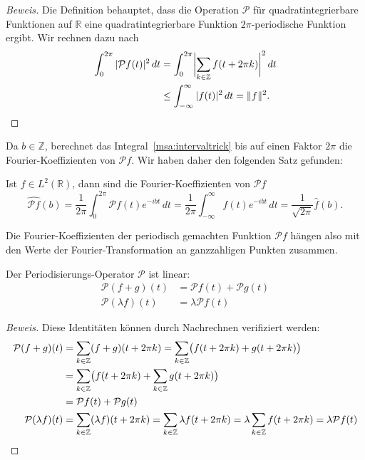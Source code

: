 \begin{proof}[Beweis]
Die Definition behauptet, dass die Operation $\mathcal{P}$ für
quadratintegrierbare Funktionen auf $\mathbb R$ eine quadratintegrierbare
Funktion $2\pi$-periodische Funktion ergibt.
Wir rechnen dazu nach
\begin{align*}
\int_{0}^{2\pi}
| \mathcal{P}f(t)|^2
\,dt
&=
\int_{0}^{2\pi}
\biggl|
\sum_{k\in\mathbb Z}f(t+2\pi k)
\biggr|^2
\,dt
\\
&\le
\int_{-\infty}^\infty |f(t)|^2 \,dt
=
\| f\|^2.
\qedhere
\end{align*}
\end{proof}

Da $b\in\mathbb Z$, berechnet das Integral~\eqref{msa:intervaltrick}
bis auf einen Faktor $2\pi$ die Fourier-Koeffizienten von $\mathcal{P}f$.
Wir haben daher den folgenden Satz gefunden:

\begin{satz}
\label{msa:Pfourier}
Ist $f\in L^2(\mathbb R)$, dann sind die Fourier-Koeffizienten von
$\mathcal{P}f$
\[
\widehat{\mathcal{P}f}(b)
=
\frac1{2\pi}\int_{0}^{2\pi} \mathcal{P}f(t) e^{-ibt}\,dt
=
\frac1{2\pi}
\int_{-\infty}^\infty f(t) e^{-ibt}\,dt
=
\frac{1}{\sqrt{2\pi}} \hat{f}(b).
\]
\end{satz}

Die Fourier-Koeffizienten der periodisch gemachten Funktion $\mathcal{P}f$ 
hängen also mit den Werte der Fourier-Transformation an ganzzahligen
Punkten zusammen.

\begin{lemma}
Der Periodisierungs-Operator $\mathcal{P}$ ist linear:
\begin{align*}
\mathcal{P}(f+g)(t)
&=
\mathcal{P}f(t) + \mathcal{P}g(t)
\\
\mathcal{P}(\lambda f)(t)
&=
\lambda \mathcal{P}f(t)
\end{align*}
\end{lemma}

\begin{proof}[Beweis]
Diese Identitäten können durch Nachrechnen verifiziert werden:
\begin{align*}
\mathcal{P}(f+g)(t)
&=
\sum_{k\in\mathbb Z}(f+g)(t+2\pi k)
=
\sum_{k\in\mathbb Z}\bigl(f(t+2\pi k)+ g(t+2\pi k)\bigr)
\\
&=
\sum_{k\in\mathbb Z}\bigl(f(t+2\pi k)
+
\sum_{k\in\mathbb Z}g(t+2\pi k)\bigr)
\\
&=
\mathcal{P}f(t)
+
\mathcal{P}g(t)
\\
\mathcal{P}(\lambda f)(t)
&=
\sum_{k\in\mathbb Z}(\lambda f)(t+2\pi k)
=
\sum_{k\in\mathbb Z}\lambda f(t+2\pi k)
=
\lambda
\sum_{k\in\mathbb Z}f(t+2\pi k)
=
\lambda \mathcal{P}f(t)
\qedhere
\end{align*}
\end{proof}

